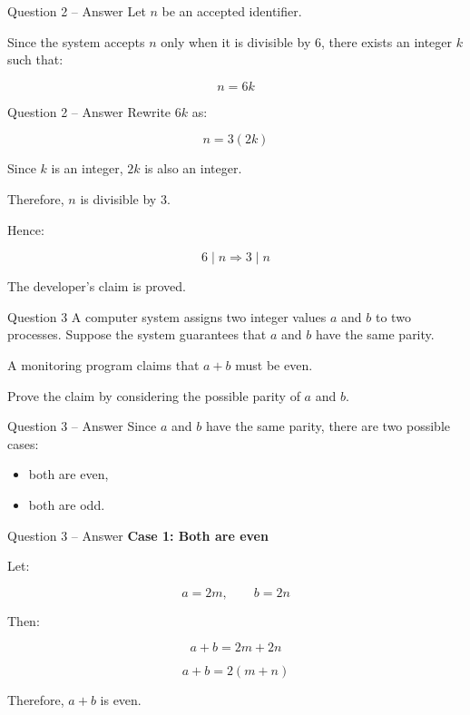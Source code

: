 \begin{frame}{Question 2 -- Answer}
Let $n$ be an accepted identifier.

Since the system accepts $n$ only when it is divisible by $6$, there exists
an integer $k$ such that:

$$
n=6k
$$

\end{frame}

\begin{frame}{Question 2 -- Answer}
Rewrite $6k$ as:

$$
n=3(2k)
$$

Since $k$ is an integer, $2k$ is also an integer.

Therefore, $n$ is divisible by $3$.

Hence:

$$
\boxed{6\mid n\Rightarrow3\mid n}
$$

The developer's claim is proved.
\end{frame}


\begin{frame}{Question 3}
A computer system assigns two integer values $a$ and $b$ to two processes.
Suppose the system guarantees that $a$ and $b$ have the same parity.

A monitoring program claims that $a+b$ must be even.

Prove the claim by considering the possible parity of $a$ and $b$.
\end{frame}

\begin{frame}{Question 3 -- Answer}
Since $a$ and $b$ have the same parity, there are two possible cases:

\begin{itemize}
\item both are even,
\item both are odd.
\end{itemize}
\end{frame}

\begin{frame}{Question 3 -- Answer}
\textbf{Case 1: Both are even}

Let:

$$
a=2m,\qquad b=2n
$$

Then:

$$
a+b=2m+2n
$$

$$
a+b=2(m+n)
$$

Therefore, $a+b$ is even.
\end{frame}

